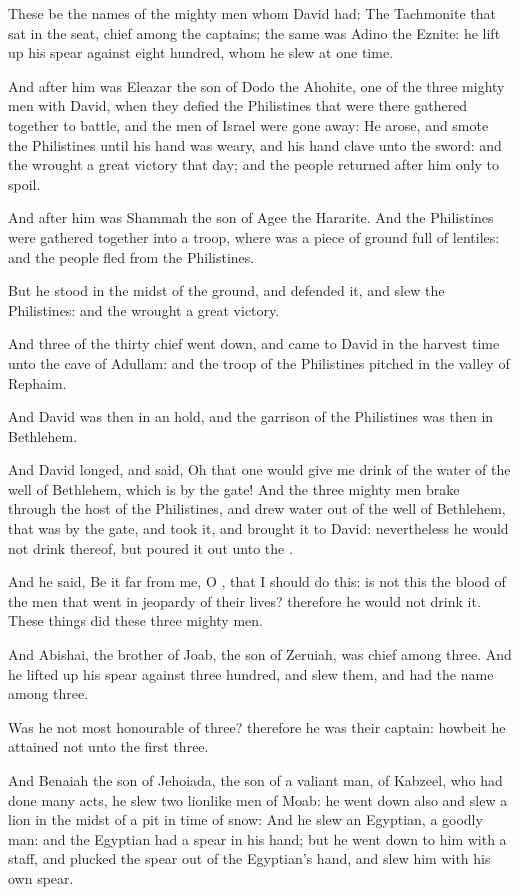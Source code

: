\verse These be the names of the mighty men whom David had: The Tachmonite that sat in the seat, chief among the captains; the same was Adino the Eznite: he lift up his spear against eight hundred, whom he slew at one time.

\verse And after him was Eleazar the son of Dodo the Ahohite, one of the three mighty men with David, when they defied the Philistines that were there gathered together to battle, and the men of Israel were gone away: \verse He arose, and smote the Philistines until his hand was weary, and his hand clave unto the sword: and the \LORD wrought a great victory that day; and the people returned after him only to spoil.

\verse And after him was Shammah the son of Agee the Hararite. And the Philistines were gathered together into a troop, where was a piece of ground full of lentiles: and the people fled from the Philistines.

\verse But he stood in the midst of the ground, and defended it, and slew the Philistines: and the \LORD wrought a great victory.

\verse And three of the thirty chief went down, and came to David in the harvest time unto the cave of Adullam: and the troop of the Philistines pitched in the valley of Rephaim.

\verse And David was then in an hold, and the garrison of the Philistines was then in Bethlehem.

\verse And David longed, and said, Oh that one would give me drink of the water of the well of Bethlehem, which is by the gate!  \verse And the three mighty men brake through the host of the Philistines, and drew water out of the well of Bethlehem, that was by the gate, and took it, and brought it to David: nevertheless he would not drink thereof, but poured it out unto the \LORD.

\verse And he said, Be it far from me, O \LORD, that I should do this: is not this the blood of the men that went in jeopardy of their lives?  therefore he would not drink it. These things did these three mighty men.

\verse And Abishai, the brother of Joab, the son of Zeruiah, was chief among three. And he lifted up his spear against three hundred, and slew them, and had the name among three.

\verse Was he not most honourable of three? therefore he was their captain: howbeit he attained not unto the first three.

\verse And Benaiah the son of Jehoiada, the son of a valiant man, of Kabzeel, who had done many acts, he slew two lionlike men of Moab: he went down also and slew a lion in the midst of a pit in time of snow: \verse And he slew an Egyptian, a goodly man: and the Egyptian had a spear in his hand; but he went down to him with a staff, and plucked the spear out of the Egyptian's hand, and slew him with his own spear.

